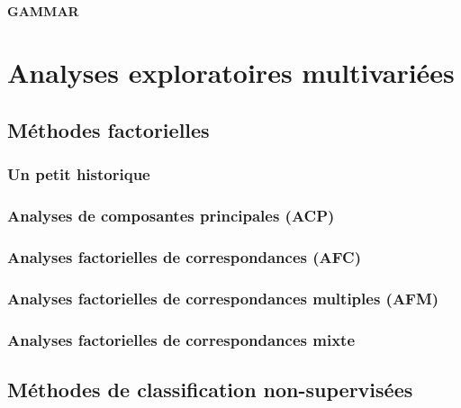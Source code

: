 \documentclass[
  11pt,
  french,
]{book}
\begin{document}
\hypertarget{sect0822}{%
\subsection{GAMMAR}\label{sect0822}}

\hypertarget{part-analyses-exploratoires-multivariuxe9es}{%
\part{Analyses exploratoires multivariées}\label{part-analyses-exploratoires-multivariuxe9es}}

\hypertarget{chap09}{%
\chapter{Méthodes factorielles}\label{chap09}}

\hypertarget{sect091}{%
\section{Un petit historique}\label{sect091}}

\hypertarget{sect092}{%
\section{Analyses de composantes principales (ACP)}\label{sect092}}

\hypertarget{sect093}{%
\section{Analyses factorielles de correspondances (AFC)}\label{sect093}}

\hypertarget{sect094}{%
\section{Analyses factorielles de correspondances multiples (AFM)}\label{sect094}}

\hypertarget{sect095}{%
\section{Analyses factorielles de correspondances mixte}\label{sect095}}

\hypertarget{chap10}{%
\chapter{Méthodes de classification non-supervisées}\label{chap10}}
\end{document}
